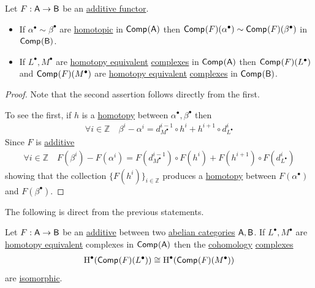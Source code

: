 \documentclass[../../../main]{subfiles}
\begin{document}
\begin{lemma}\label{lemma:additive-functors-and-homotopy}
  Let \(F: \mathsf{A} \to \mathsf{B}\) be an \hyperref[def:additive-functor]{additive functor}.
  \begin{itemize}
  \item If \(\alpha^{\bullet} \sim \beta^{\bullet}\) are \hyperref[def:homotopy]{homotopic} in \(\mathsf{Comp}^{}(\mathsf{A})\) then \(\mathsf{Comp}^{}(F)(\alpha^{\bullet}) \sim \mathsf{Comp}^{}(F)(\beta^{\bullet})\) in \(\mathsf{Comp}^{}(\mathsf{B})\).
    \item If \(L^{\bullet}, M^{\bullet}\) are \hyperref[def:homotopy-equivalence]{homotopy equivalent} \hyperref[def:complex]{complexes} in \(\mathsf{Comp}^{}(\mathsf{A})\) then \(\mathsf{Comp}^{}(F)(L^{\bullet})\) and \(\mathsf{Comp}^{}(F)(M^{\bullet})\) are \hyperref[def:homotopy-equivalence]{homotopy equivalent} \hyperref[def:complex]{complexes} in \(\mathsf{Comp}^{}(\mathsf{B})\).
  \end{itemize}
\end{lemma}
\begin{proof}
  Note that the second assertion follows directly from the first.

  To see the first, if \(h\) is a \hyperref[def:homotopy]{homotopy} between \(\alpha^{\bullet}, \beta^{\bullet}\) then
  \begin{align*}
    \forall i \in \mathbb{Z} \quad \beta^{i} - \alpha^{i} = d_{M^{\bullet}}^{i-1} \circ h^{i} + h^{i+1} \circ d_{L^{\bullet}}^{i}
  \end{align*}
  Since \(F\) is \hyperref[def:additive-functor]{additive}
  \begin{align*}
    \forall i \in \mathbb{Z} \quad F(\beta^{i}) - F(\alpha^{i}) = F(d_{M^{\bullet}}^{i-1}) \circ F(h^{i}) + F(h^{i+1}) \circ F(d_{L^{\bullet}}^{i})
  \end{align*}
  showing that the collection \(\{F(h^{i})\}_{i \in \mathbb{Z}}\) produces a \hyperref[def:homotopy]{homotopy} between \(F(\alpha^{\bullet})\) and \(F(\beta^{\bullet})\).
\end{proof}

The following is direct from the previous statements.
\begin{theorem}
  Let \(F: \mathsf{A} \to \mathsf{B}\) be an \hyperref[def:additive-functor]{additive} between two \hyperref[def:abelian-category]{abelian categories} \(\mathsf{A}, \mathsf{B}\).
  If \(L^{\bullet}, M^{\bullet}\) are \hyperref[def:homotopy-equivalence]{homotopy equivalent} complexes in \(\mathsf{Comp}^{}(\mathsf{A})\) then the \hyperref[def:cohomology]{cohomology} \hyperref[def:complex]{complexes}
  \begin{align*}
    \operatorname{H}^{\bullet}(\mathsf{Comp}^{}(F)(L^{\bullet})) \cong \operatorname{H}^{\bullet}(\mathsf{Comp}^{}(F)(M^{\bullet}))
  \end{align*}
  are \hyperref[def:categorical-isomorphism]{isomorphic}.
\end{theorem}
\end{document}
